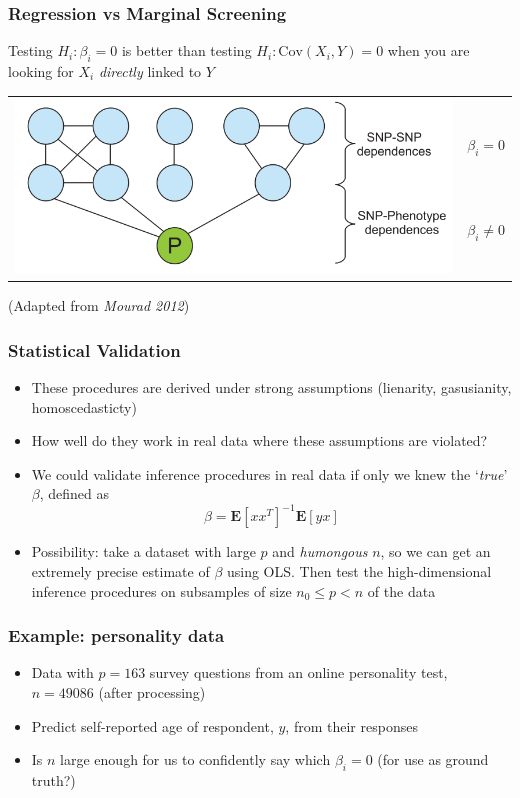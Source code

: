 \documentclass{beamer}
\newcommand{\E}{\textbf{E}}
\newcommand{\Cov}{\text{Cov}}
\begin{document}
\begin{frame}
\frametitle{Regression vs Marginal Screening}
Testing $H_i: \beta_i = 0$ is better than testing $H_i: \Cov(X_i, Y) = 0$
when you are looking for $X_i$ \emph{directly} linked to $Y$
\begin{center}
\begin{tabular}{cc}
\multirow{5}{*}{\includegraphics[scale = 0.3]{pgm.png}} & \\
& $\beta_i = 0$\\
& \vspace{0.2in}\\
& $\beta_i \neq 0$\\
& \vspace{0.2in}\\
\end{tabular}
\end{center}
(Adapted from \emph{Mourad 2012})
\end{frame}

\begin{frame}
\frametitle{Statistical Validation}
\begin{itemize}
\item<1-> These procedures are derived under strong assumptions (lienarity, gasusianity, homoscedasticty)
\item<1-> How well do they work in real data where these assumptions are violated?
\item<1-> We could validate inference procedures in real data if only we knew the `\emph{true}' $\beta$, defined as
\[
\beta = \E[x x^T]^{-1} \E[yx]
\]
\item<2-> Possibility: take a dataset with large $p$ and
  \emph{humongous} $n$, so we can get an extremely precise estimate of
  $\beta$ using OLS. Then test the high-dimensional inference
  procedures on subsamples of size $n_0 \leq p < n$ of the data
\end{itemize}
\end{frame}

\begin{frame}
\frametitle{Example: personality data}
\begin{itemize}
\item Data with $p = 163$ survey questions from an online personality test, $n = 49086$ (after processing)
\item Predict self-reported age of respondent, $y$, from their responses
\item Is $n$ large enough for us to confidently say which $\beta_i = 0$ (for use as ground truth?)
\end{itemize}
\end{frame}
\end{document}
